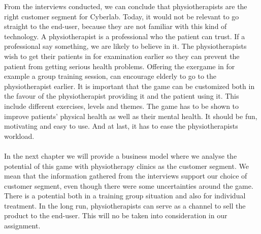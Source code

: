 From the interviews conducted, we can conclude that physiotherapists are the right customer segment for Cyberlab. Today, it would not be relevant to go straight to the end-user, because they are not familiar with this kind of technology. A physiotherapist is a professional who the patient can trust. If a professional say something, we are likely to believe in it.  The physiotherapists wish to get their patients in for examination earlier so they can prevent the patient from getting serious health problems. Offering the exergame in for example a group training session, can encourage elderly to go to the physiotherapist earlier. It is important that the game can be customized both in the favour of the physiotherapist providing it and the patient using it. This include different exercises, levels and themes. The game has to be shown to improve patients' physical health as well as their mental health. It should be fun, motivating and easy to use. And at last, it has to ease the physiotherapists workload. \\ \\
In the next chapter we will provide a business model where we analyse the potential of this game with physiotherapy clinics as the customer segment. We mean that the information gathered from the interviews support our choice of customer segment, even though there were some uncertainties around the game. There is a potential both in a training group situation and also for individual treatment. In the long run, physiotherapists can serve as a channel to sell the product to the end-user. This will no be taken into consideration in our assignment. 